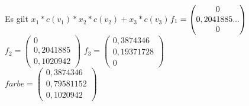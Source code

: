 \documentclass[10pt,a4paper]{article}
\begin{document}
Es gilt $x_1*c(v_1)*x_2*c(v_2)+x_3*c(v_3)$$
\\f_1 =\begin{pmatrix}
0 \\
0,2041885... \\
0
\end{pmatrix}
$ $
f_2 =\begin{pmatrix}
0 \\
0,2041885 \\
 0,1020942
\end{pmatrix}
$ 
$
f_3 =\begin{pmatrix}
0,3874346  \\
0,19371728 \\
0
\end{pmatrix}
$
\\
$
farbe =\begin{pmatrix}
0,3874346  \\
0,79581152\\
 0,1020942
\end{pmatrix}
$ 
\end{document}
